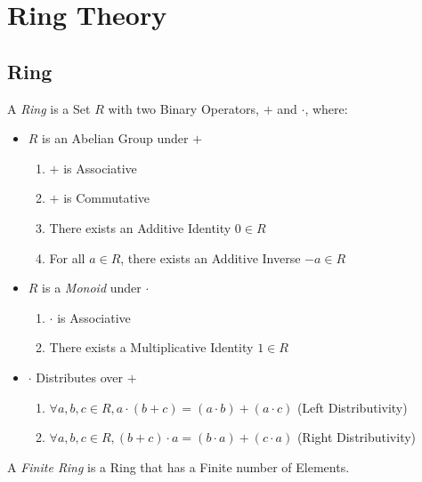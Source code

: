 \section{Ring Theory}\label{sec:ring_theory}

\subsection{Ring}\label{subsec:ring}

A \emph{Ring} is a Set $R$ with two Binary Operators, $+$ and
$\cdot$, where:

\begin{itemize}
\item $R$ is an Abelian Group under $+$
    \begin{enumerate}
        \item $+$ is Associative
        \item $+$ is Commutative
        \item There exists an Additive Identity $0 \in R$
        \item For all $a \in R$, there exists an Additive Inverse $-a
          \in R$
    \end{enumerate}
\item $R$ is a \emph{Monoid} under $\cdot$
    \begin{enumerate}
        \item $\cdot$ is Associative
        \item There exists a Multiplicative Identity $1 \in R$
    \end{enumerate}
\item $\cdot$ Distributes over $+$
    \begin{enumerate}
        \item $\forall a,b,c \in R,
            a \cdot (b + c) = (a \cdot b) + (a \cdot c)$
            (Left Distributivity)
        \item $\forall a,b,c \in R,
            (b + c) \cdot a = (b \cdot a) + (c \cdot a)$
            (Right Distributivity)
    \end{enumerate}
\end{itemize}

A \emph{Finite Ring} is a Ring that has a Finite number of Elements.

